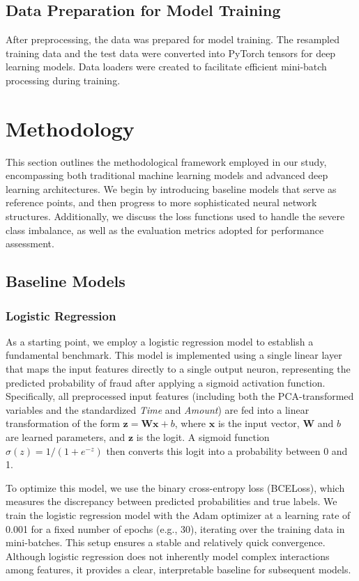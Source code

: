 \documentclass[11pt, oneside]{article}   	%
\begin{document}
\subsection{Data Preparation for Model Training}

After preprocessing, the data was prepared for model training. The resampled training data and the test data were converted into PyTorch tensors for deep learning models. Data loaders were created to facilitate efficient mini-batch processing during training.


\section{Methodology}

This section outlines the methodological framework employed in our study, encompassing both traditional machine learning models and advanced deep learning architectures. We begin by introducing baseline models that serve as reference points, and then progress to more sophisticated neural network structures. Additionally, we discuss the loss functions used to handle the severe class imbalance, as well as the evaluation metrics adopted for performance assessment.

\subsection{Baseline Models}

\subsubsection{Logistic Regression}

As a starting point, we employ a logistic regression model to establish a fundamental benchmark. This model is implemented using a single linear layer that maps the input features directly to a single output neuron, representing the predicted probability of fraud after applying a sigmoid activation function. Specifically, all preprocessed input features (including both the PCA-transformed variables and the standardized \textit{Time} and \textit{Amount}) are fed into a linear transformation of the form \(\mathbf{z} = \mathbf{W}\mathbf{x} + b\), where \(\mathbf{x}\) is the input vector, \(\mathbf{W}\) and \(b\) are learned parameters, and \(\mathbf{z}\) is the logit. A sigmoid function \(\sigma(z) = 1/(1 + e^{-z})\) then converts this logit into a probability between 0 and 1.

To optimize this model, we use the binary cross-entropy loss (BCELoss), which measures the discrepancy between predicted probabilities and true labels. We train the logistic regression model with the Adam optimizer at a learning rate of 0.001 for a fixed number of epochs (e.g., 30), iterating over the training data in mini-batches. This setup ensures a stable and relatively quick convergence. Although logistic regression does not inherently model complex interactions among features, it provides a clear, interpretable baseline for subsequent models.
\end{document}

